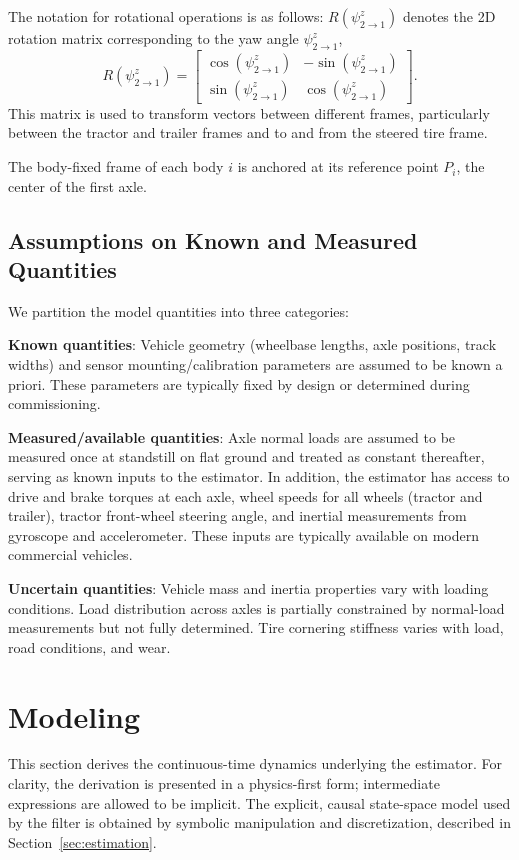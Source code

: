 \documentclass[conference]{IEEEtran}
\begin{document}
The notation for rotational operations is as follows: $R(\psi_{2\to1}^z)$ denotes the 2D rotation matrix corresponding to the yaw angle $\psi_{2\to1}^z$,
\begin{equation}
    R(\psi_{2\to1}^z) = \begin{bmatrix}
    \cos(\psi_{2\to1}^z) & -\sin(\psi_{2\to1}^z) \\
    \sin(\psi_{2\to1}^z) & \cos(\psi_{2\to1}^z) 
\end{bmatrix}.
\end{equation}
This matrix is used to transform vectors between different frames, particularly between the tractor and trailer frames and to and from the steered tire frame.

The body-fixed frame of each body $i$ is anchored at its reference point $P_i$, the center of the first axle.

\subsection{Assumptions on Known and Measured Quantities}
We partition the model quantities into three categories:

\textbf{Known quantities}: Vehicle geometry (wheelbase lengths, axle positions, track widths) and sensor mounting/calibration parameters are assumed to be known a priori. These parameters are typically fixed by design or determined during commissioning.

\textbf{Measured/available quantities}: Axle normal loads are assumed to be measured once at standstill on flat ground and treated as constant thereafter, serving as known inputs to the estimator. In addition, the estimator has access to drive and brake torques at each axle, wheel speeds for all wheels (tractor and trailer), tractor front-wheel steering angle, and inertial measurements from gyroscope and accelerometer. These inputs are typically available on modern commercial vehicles.

\textbf{Uncertain quantities}: Vehicle mass and inertia properties vary with loading conditions. Load distribution across axles is partially constrained by normal-load measurements but not fully determined. Tire cornering stiffness varies with load, road conditions, and wear.

\section{Modeling}
\label{sec:modeling}
This section derives the continuous-time dynamics underlying the estimator. For clarity, the derivation is presented in a physics-first form; intermediate expressions are allowed to be implicit. The explicit, causal state-space model used by the filter is obtained by symbolic manipulation and discretization, described in Section~\ref{sec:estimation}.
\end{document}
